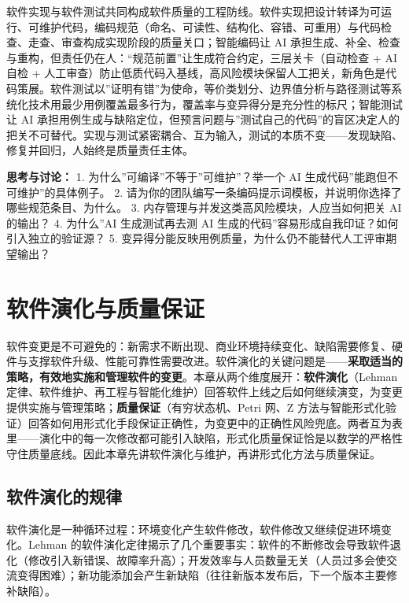 \documentclass[
]{ctexbook}
\begin{document}
软件实现与软件测试共同构成软件质量的工程防线。软件实现把设计转译为可运行、可维护代码，编码规范（命名、可读性、结构化、容错、可重用）与代码检查、走查、审查构成实现阶段的质量关口；智能编码让
AI
承担生成、补全、检查与重构，但责任仍在人：``规范前置''让生成符合约定，三层关卡（自动检查
+ AI 自检 +
人工审查）防止低质代码入基线，高风险模块保留人工把关，新角色是代码策展。软件测试以''证明有错''为使命，等价类划分、边界值分析与路径测试等系统化技术用最少用例覆盖最多行为，覆盖率与变异得分是充分性的标尺；智能测试让
AI
承担用例生成与缺陷定位，但预言问题与''测试自己的代码''的盲区决定人的把关不可替代。实现与测试紧密耦合、互为输入，测试的本质不变------发现缺陷、修复并回归，人始终是质量责任主体。

\textbf{思考与讨论：} 1. 为什么''可编译''不等于''可维护''？举一个 AI
生成代码''能跑但不可维护''的具体例子。 2.
请为你的团队编写一条编码提示词模板，并说明你选择了哪些规范条目、为什么。
3. 内存管理与并发这类高风险模块，人应当如何把关 AI 的输出？ 4.
为什么''AI 生成测试再去测 AI
生成的代码''容易形成自我印证？如何引入独立的验证源？ 5.
变异得分能反映用例质量，为什么仍不能替代人工评审期望输出？

\chapter{软件演化与质量保证}\label{ux8f6fux4ef6ux6f14ux5316ux4e0eux8d28ux91cfux4fddux8bc1}

软件变更是不可避免的：新需求不断出现、商业环境持续变化、缺陷需要修复、硬件与支撑软件升级、性能可靠性需要改进。软件演化的关键问题是------\textbf{采取适当的策略，有效地实施和管理软件的变更}。本章从两个维度展开：\textbf{软件演化}（Lehman
定律、软件维护、再工程与智能化维护）回答软件上线之后如何继续演变，为变更提供实施与管理策略；\textbf{质量保证}（有穷状态机、Petri
网、Z
方法与智能形式化验证）回答如何用形式化手段保证正确性，为变更中的正确性风险兜底。两者互为表里------演化中的每一次修改都可能引入缺陷，形式化质量保证恰是以数学的严格性守住质量底线。因此本章先讲软件演化与维护，再讲形式化方法与质量保证。

\section{软件演化的规律}\label{ux8f6fux4ef6ux6f14ux5316ux7684ux89c4ux5f8b}

软件演化是一种循环过程：环境变化产生软件修改，软件修改又继续促进环境变化。Lehman
的软件演化定律揭示了几个重要事实：软件的不断修改会导致软件退化（修改引入新错误、故障率升高）；开发效率与人员数量无关（人员过多会使交流变得困难）；新功能添加会产生新缺陷（往往新版本发布后，下一个版本主要修补缺陷）。
\end{document}
